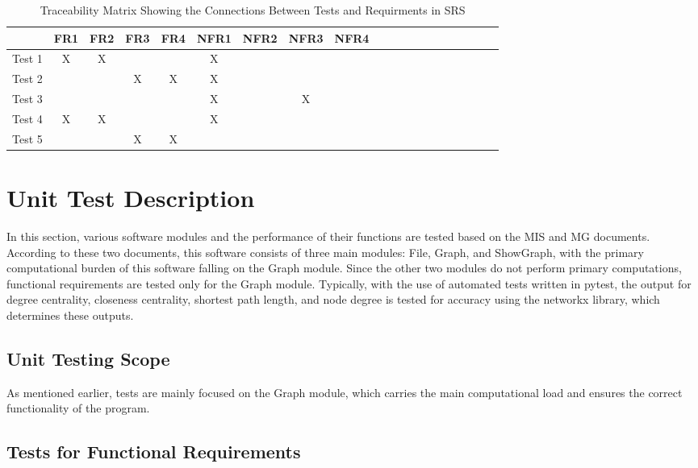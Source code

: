 \documentclass[12pt, titlepage]{article}
\begin{document}
\begin{table}[h!]
\centering
\begin{tabular}{|c|c|c|c|c|c|c|c|c|c|c|c|c|c|c|c|c|c|c|c|}
\hline
	&FR1 &FR2 & FR3 & FR4 &NFR1 &NFR2 & NFR3 & NFR4\\
\hline
Test 1     & X& X&  &  & X & & & \\ \hline
Test 2    & &   &  X&X  & X & & & \\ \hline
Test 3     &   &   &  &  & X & & X& \\ \hline
Test 4     &X  &X   &  &  & X & & & \\ \hline
Test 5    &  &  & X & X &  & & & \\ \hline

\end{tabular}
\caption{Traceability Matrix Showing the Connections Between Tests and Requirments in SRS}
\label{Table:A_trace}
\end{table}
\newpage
\section{Unit Test Description}

In this section, various software modules and the performance of their functions are tested based on the MIS and MG documents. According to these two documents, this software consists of three main modules: File, Graph, and ShowGraph, with the primary computational burden of this software falling on the Graph module. Since the other two modules do not perform primary computations, functional requirements are tested only for the Graph module. Typically, with the use of automated tests written in pytest, the output for degree centrality, closeness centrality, shortest path length, and node degree is tested for accuracy using the networkx library, which determines these outputs.

\subsection{Unit Testing Scope}


As mentioned earlier, tests are mainly focused on the Graph module, which carries the main computational load and ensures the correct functionality of the program.

\subsection{Tests for Functional Requirements}
\end{document}
